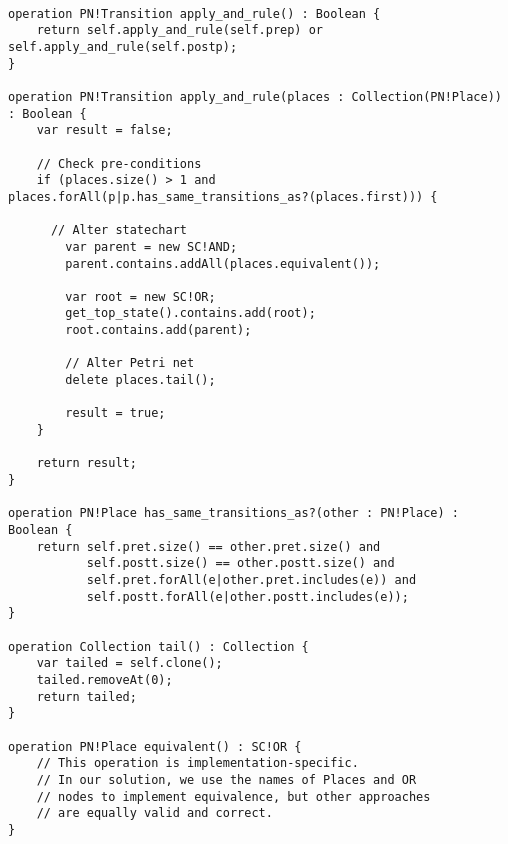 
\tt
\begin{lstlisting}
operation PN!Transition apply_and_rule() : Boolean {
	return self.apply_and_rule(self.prep) or self.apply_and_rule(self.postp);
}

operation PN!Transition apply_and_rule(places : Collection(PN!Place)) : Boolean {
	var result = false;
	
	// Check pre-conditions
	if (places.size() > 1 and places.forAll(p|p.has_same_transitions_as?(places.first))) {
	  
	  // Alter statechart
		var parent = new SC!AND;
		parent.contains.addAll(places.equivalent());
		
		var root = new SC!OR;
		get_top_state().contains.add(root);		
		root.contains.add(parent);
		
		// Alter Petri net
		delete places.tail();
		
		result = true;
	}
	
	return result;
}

operation PN!Place has_same_transitions_as?(other : PN!Place) : Boolean {
	return self.pret.size() == other.pret.size() and
	       self.postt.size() == other.postt.size() and
	       self.pret.forAll(e|other.pret.includes(e)) and
	       self.postt.forAll(e|other.postt.includes(e));
}

operation Collection tail() : Collection {
	var tailed = self.clone();
	tailed.removeAt(0);
	return tailed;
}

operation PN!Place equivalent() : SC!OR {
	// This operation is implementation-specific.
	// In our solution, we use the names of Places and OR
	// nodes to implement equivalence, but other approaches
	// are equally valid and correct.
}
\end{lstlisting}